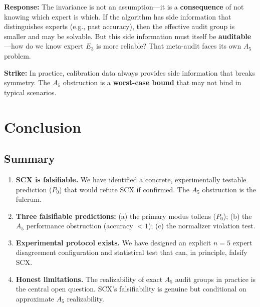 \documentclass[12pt,a4paper]{article}
\theoremstyle{remark}
\begin{document}
\textbf{Response:} The invariance is not an assumption---it is a \textbf{consequence} of not knowing which expert is which. If the algorithm has side information that distinguishes experts (e.g., past accuracy), then the effective audit group is smaller and may be solvable. But this side information must itself be \textbf{auditable}---how do we know expert \(E_3\) is more reliable? That meta-audit faces its own \(A_5\) problem.

\textbf{Strike:} In practice, calibration data always provides side information that breaks symmetry. The \(A_5\) obstruction is a \textbf{worst-case bound} that may not bind in typical scenarios.
\section{Conclusion}
\subsection{Summary}
\begin{enumerate}[label=(\arabic*),itemsep=3pt]
    \item \textbf{SCX is falsifiable.} We have identified a concrete, experimentally testable prediction (\(P_0\)) that would refute SCX if confirmed. The \(A_5\) obstruction is the fulcrum.
    \item \textbf{Three falsifiable predictions:}
    (a) the primary modus tollens (\(P_0\));
    (b) the \(A_5\) performance obstruction (accuracy \(<1\));
    (c) the normalizer violation test.
    \item \textbf{Experimental protocol exists.} We have designed an explicit \(n=5\) expert disagreement configuration and statistical test that can, in principle, falsify SCX.
    \item \textbf{Honest limitations.} The realizability of exact \(A_5\) audit groups in practice is the central open question. SCX's falsifiability is genuine but conditional on approximate \(A_5\) realizability.
\end{enumerate}
\end{document}
